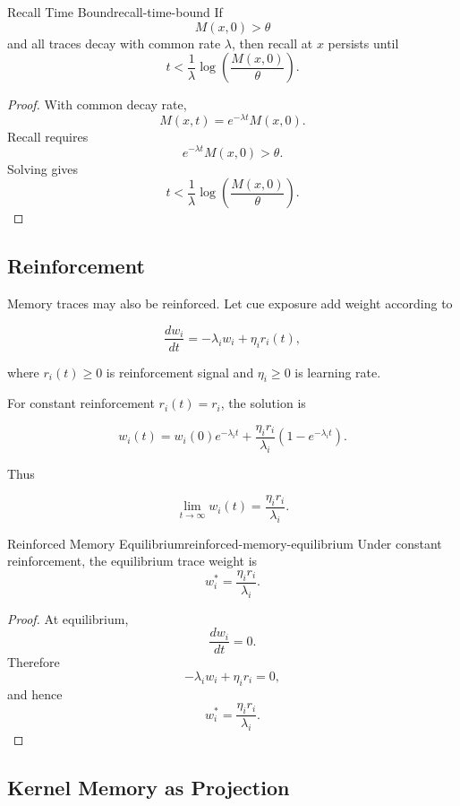 \documentclass[12pt,twoside,openright]{book}
\begin{document}
\begin{corollary}{Recall Time Bound}{recall-time-bound}
  If
  \[
    M(x,0)>\theta
  \]
  and all traces decay with common rate \(\lambda\), then
  recall at \(x\) persists until
  \[
    t
    <
    \frac1\lambda
    \log
    \left(
      \frac{M(x,0)}{\theta}
    \right).
  \]
\end{corollary}

\begin{proof}
  With common decay rate,
  \[
    M(x,t)=e^{-\lambda t}M(x,0).
  \]
  Recall requires
  \[
    e^{-\lambda t}M(x,0)>\theta.
  \]
  Solving gives
  \[
    t<
    \frac1\lambda
    \log
    \left(
      \frac{M(x,0)}{\theta}
    \right).
  \]
\end{proof}

\subsection{Reinforcement}

Memory traces may also be reinforced. Let cue exposure add
weight according to

\[
\frac{dw_i}{dt}
=
-\lambda_i w_i
+
\eta_i r_i(t),
\]

where \(r_i(t)\ge0\) is reinforcement signal and
\(\eta_i\ge0\) is learning rate.

For constant reinforcement \(r_i(t)=r_i\), the solution is

\[
w_i(t)
=
w_i(0)e^{-\lambda_i t}
+
\frac{\eta_i r_i}{\lambda_i}
\left(1-e^{-\lambda_i t}\right).
\]

Thus

\[
\lim_{t\to\infty}w_i(t)
=
\frac{\eta_i r_i}{\lambda_i}.
\]

\begin{proposition}{Reinforced Memory Equilibrium}{reinforced-memory-equilibrium}
  Under constant reinforcement, the equilibrium trace
  weight is
  \[
    w_i^*
=
    \frac{\eta_i r_i}{\lambda_i}.
  \]
\end{proposition}

\begin{proof}
  At equilibrium,
  \[
    \frac{dw_i}{dt}=0.
  \]
  Therefore
  \[
    -\lambda_i w_i+\eta_i r_i=0,
  \]
  and hence
  \[
    w_i^*=\frac{\eta_i r_i}{\lambda_i}.
  \]
\end{proof}

\subsection{Kernel Memory as Projection}
\end{document}
